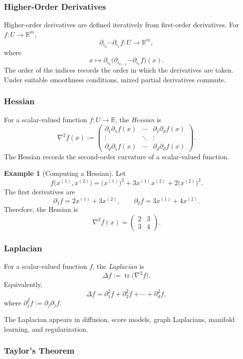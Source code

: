 \documentclass[12pt,oneside]{book}
\numberwithin{equation}{section}
\theoremstyle{definition}
\newtheorem{example}{Example}[section]
\theoremstyle{plain}
\theoremstyle{remark}
\newcommand{\R}{\mathbb{R}}
\newcommand{\tr}{\operatorname{tr}}
\begin{document}
\subsubsection{Higher-Order Derivatives}
Higher-order derivatives are defined iteratively from first-order derivatives. For $f\colon U\to\R^m$,
\[
\partial_{i_k}\cdots\partial_{i_1}f\colon U\to\R^m,
\]
where
\[
x\longmapsto
\partial_{i_k}\bigl(\partial_{i_{k-1}}\cdots
\partial_{i_1}f\bigr)(x).
\]
The order of the indices records the order in which the derivatives are taken. Under suitable smoothness conditions, mixed partial derivatives commute.

\subsubsection{Hessian}
For a scalar-valued function $f\colon U\to\R$, the \emph{Hessian} is
\[
\nabla^2f(x):=
\begin{pmatrix}
\partial_1\partial_1f(x)&\cdots&\partial_1\partial_df(x)\\
\vdots&\ddots&\vdots\\
\partial_d\partial_1f(x)&\cdots&\partial_d\partial_df(x)
\end{pmatrix}.
\]
The Hessian records the second-order curvature of a scalar-valued function.

\begin{example}[Computing a Hessian]
Let
\[
f\bigl(x^{(1)},x^{(2)}\bigr)
=\bigl(x^{(1)}\bigr)^2
+3x^{(1)}x^{(2)}
+2\bigl(x^{(2)}\bigr)^2.
\]
The first derivatives are
\[
\partial_1f=2x^{(1)}+3x^{(2)},
\qquad
\partial_2f=3x^{(1)}+4x^{(2)}.
\]
Therefore, the Hessian is
\[
\nabla^2f(x)=
\begin{pmatrix}
2&3\\
3&4
\end{pmatrix}.
\]
\end{example}

\subsubsection{Laplacian}
For a scalar-valued function $f$, the \emph{Laplacian} is
\[
\Delta f:=\tr\bigl(\nabla^2f\bigr).
\]
Equivalently,
\[
\Delta f
=\partial_1^2f+\partial_2^2f+\cdots+\partial_d^2f,
\]
where $\partial_j^2f:=\partial_j\partial_jf$.

The Laplacian appears in diffusion, score models, graph Laplacians, manifold learning, and regularization.

\subsubsection{Taylor's Theorem}
\end{document}
